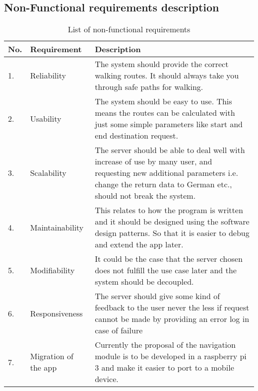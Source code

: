         \subsection{Non-Functional requirements description}
            \label{ssec:nonFuncList}
            \begin{table}[h!]
                \centering
                    \begin{tabular}{|p{0.5cm}||p{3cm}|p{11cm}|}
                        \hline
                            \textbf{No.} & \textbf{Requirement} & \textbf{Description} \\
                        \hline
                            1. &  Reliability & The system should provide the
                            correct walking routes. It should always take you through safe paths for 
                            walking.\\
                        \hline
                            2. & Usability & The system should be easy to use. This means the routes can be
                            calculated with just some simple parameters like start and end destination request.\\
                            
                        \hline
                            3. & Scalability & The server should be able to deal well with increase of use by many user,
                            and requesting new additional parameters i.e. change the return data to German etc., 
                            should not break the system.\\    
                        
                        \hline
                            4. & Maintainability & This relates to how the program is written and it 
                            should be designed using the software design patterns. So that it is easier to
                            debug and extend the app later.\\
                        \hline    
                            5. & Modifiability & It could be the case that the server chosen does not 
                            fulfill the use case later and the system should be decoupled.\\
                        \hline
                            6. & Responsiveness & The server should give some kind of feedback to the user
                            never the less if request cannot be made by providing an error log in case of
                            failure\\
                        \hline
                            7. & Migration of the app & Currently the proposal of the navigation module is to be
                            developed in a raspberry pi 3  and make it easier to port to a mobile device.\\ 
                                 
                        \hline    
                    \end{tabular}    
                \caption{List of non-functional requirements}
                \label{table:nonfunctionalRequirements}
            \end{table}   
